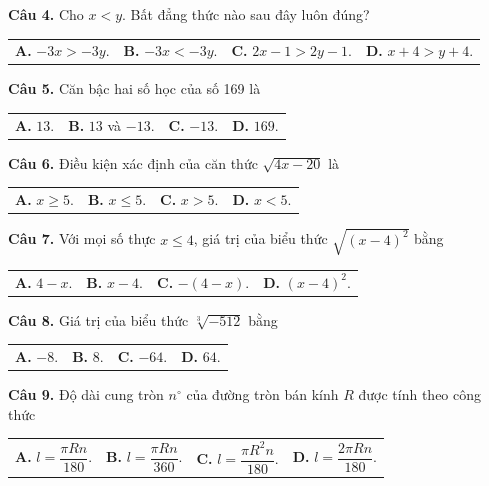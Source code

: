 \documentclass[11pt,a4paper]{article}
\begin{document}
\vspace{1.5mm}
\textbf{Câu 4.} Cho $x < y$. Bất đẳng thức nào sau đây luôn đúng?\\
\begin{tabularx}{\linewidth}{XXXX}
\textbf{A.} $-3x > -3y$. & \textbf{B.} $-3x < -3y$. & \textbf{C.} $2x - 1 > 2y - 1$. & \textbf{D.} $x + 4 > y + 4$.
\end{tabularx}

\vspace{1.5mm}
\textbf{Câu 5.} Căn bậc hai số học của số 169 là\\
\begin{tabularx}{\linewidth}{XXXX}
\textbf{A.} $13$. & \textbf{B.} $13$ và $-13$. & \textbf{C.} $-13$. & \textbf{D.} $169$.
\end{tabularx}

\vspace{1.5mm}
\textbf{Câu 6.} Điều kiện xác định của căn thức $\sqrt{4x - 20}$ là\\
\begin{tabularx}{\linewidth}{XXXX}
\textbf{A.} $x \ge 5$. & \textbf{B.} $x \le 5$. & \textbf{C.} $x > 5$. & \textbf{D.} $x < 5$.
\end{tabularx}

\vspace{1.5mm}
\textbf{Câu 7.} Với mọi số thực $x \le 4$, giá trị của biểu thức $\sqrt{(x-4)^2}$ bằng\\
\begin{tabularx}{\linewidth}{XXXX}
\textbf{A.} $4 - x$. & \textbf{B.} $x - 4$. & \textbf{C.} $-(4-x)$. & \textbf{D.} $(x-4)^2$.
\end{tabularx}

\vspace{1.5mm}
\textbf{Câu 8.} Giá trị của biểu thức $\sqrt[3]{-512}$ bằng\\
\begin{tabularx}{\linewidth}{XXXX}
\textbf{A.} $-8$. & \textbf{B.} $8$. & \textbf{C.} $-64$. & \textbf{D.} $64$.
\end{tabularx}

\vspace{1.5mm}
\textbf{Câu 9.} Độ dài cung tròn $n^\circ$ của đường tròn bán kính $R$ được tính theo công thức\\
\begin{tabularx}{\linewidth}{XXXX}
\textbf{A.} $l = \dfrac{\pi R n}{180}$. & \textbf{B.} $l = \dfrac{\pi R n}{360}$. & \textbf{C.} $l = \dfrac{\pi R^2 n}{180}$. & \textbf{D.} $l = \dfrac{2\pi R n}{180}$.
\end{tabularx}
\end{document}
